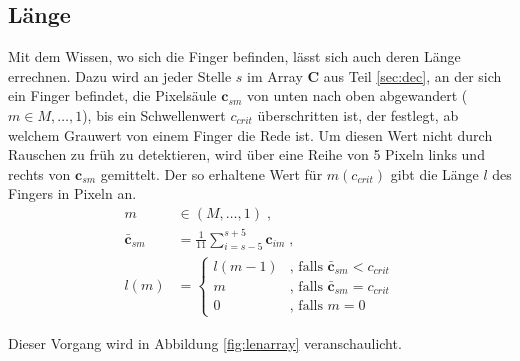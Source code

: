 \subsection{Länge}
\label{sec:lan}
Mit dem Wissen, wo sich die Finger befinden, lässt sich auch deren Länge errechnen. Dazu wird an jeder Stelle $s$ im Array $\mathbf{C}$ aus Teil \ref{sec:dec}, an der sich ein Finger befindet, die Pixelsäule $\mathbf{c}_{sm}$ von unten nach oben abgewandert ($m \in M, \dots, 1$), bis ein Schwellenwert $c_{crit}$ überschritten ist, der festlegt, ab welchem Grauwert von einem Finger die Rede ist. Um diesen Wert nicht durch Rauschen zu früh zu detektieren, wird über eine Reihe von 5 Pixeln links und rechts von $\mathbf{c}_{sm}$ gemittelt. Der so erhaltene Wert für $m(c_{crit})$ gibt die Länge $l$ des Fingers in Pixeln an.
\begin{equation}
\begin{aligned}
 m &\in (M,\dots,1) \; , \\
 \bar{\mathbf{c}}_{sm} &= \frac{1}{11}\sum_{i=s-5}^{s+5} \mathbf{c}_{im} \; , \\
 l(m) &=   \begin{cases}
	    l(m-1) & \text{, falls } \bar{\mathbf{c}}_{sm} < c_{crit}  \\
	    m      & \text{, falls } \bar{\mathbf{c}}_{sm} = c_{crit}  \\
	    0      & \text{, falls } m=0
	   \end{cases}
\end{aligned}
\end{equation}

Dieser Vorgang wird in Abbildung \ref{fig:lenarray} veranschaulicht.
 


